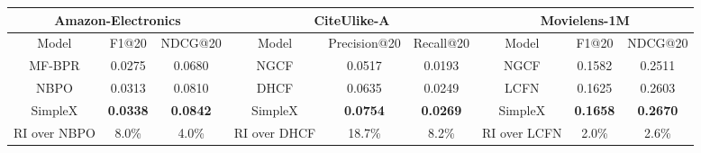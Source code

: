 \documentclass[sigconf,authorversion]{acmart}
\begin{document}
\begin{table*}[htbp]
\begin{tabular}{c|cc||c|cc||c|cc}
\hline
\multicolumn{3}{c||}{Amazon-Electronics} & \multicolumn{3}{c||}{CiteUlike-A}               & \multicolumn{3}{c}{Movielens-1M}              \\ \hline
Model        & F1@20  & \hspace{-1.5ex}NDCG@20         & Model        & \hspace{-0.5ex}Precision@20 & \hspace{-1ex}Recall@20 & Model        & F1@20  & \hspace{-1ex}NDCG@20\hspace{-0.5ex} \\ \hline
MF-BPR    & 0.0275 & 0.0680          & NGCF        & 0.0517       & 0.0193    & NGCF       & 0.1582 & 0.2511  \\
NBPO        & 0.0313 & 0.0810          & DHCF        & 0.0635       & 0.0249    & LCFN       & 0.1625 & 0.2603  \\ \hline 
SimpleX  & \textbf{0.0338} & \textbf{0.0842} & SimpleX & \textbf{0.0754} & \textbf{0.0269} & SimpleX & \textbf{0.1658} & \textbf{0.2670} \\ \hline
RI over NBPO & 8.0\%  & 4.0\%           & RI over DHCF & 18.7\%       & 8.2\%    & RI over LCFN & 2.0\%  & 2.6\%   \\ \hline
\end{tabular}
\label{fullresults2}
\end{table*}
\end{document}
